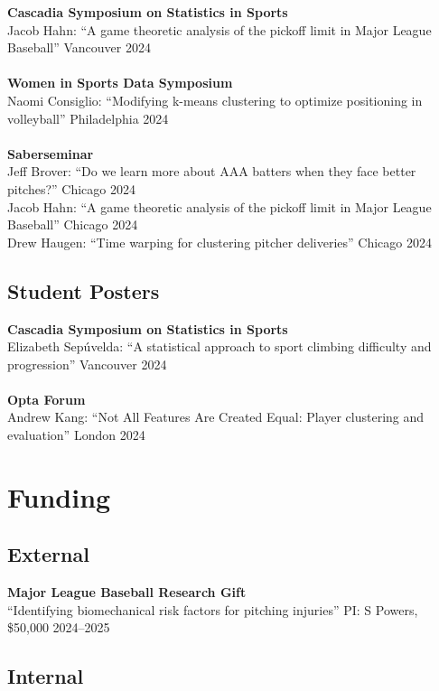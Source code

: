 \documentclass{article}
\begin{document}
{\bf Cascadia Symposium on Statistics in Sports}\\
Jacob Hahn: ``A game theoretic analysis of the pickoff limit in Major League Baseball'' \hfill Vancouver 2024\\
~\\
{\bf Women in Sports Data Symposium}\\
Naomi Consiglio: ``Modifying k-means clustering to optimize positioning in volleyball'' \hfill Philadelphia 2024\\
~\\
{\bf Saberseminar}\\
Jeff Brover: ``Do we learn more about AAA batters when they face better pitches?'' \hfill Chicago 2024\\
Jacob Hahn: ``A game theoretic analysis of the pickoff limit in Major League Baseball'' \hfill Chicago 2024\\
Drew Haugen: ``Time warping for clustering pitcher deliveries'' \hfill Chicago 2024

\subsection*{\sc Student Posters}

{\bf Cascadia Symposium on Statistics in Sports}\\
Elizabeth Sep\'uvelda: ``A statistical approach to sport climbing difficulty and progression'' \hfill Vancouver 2024\\
~\\
{\bf Opta Forum}\\
Andrew Kang: ``Not All Features Are Created Equal: Player clustering and evaluation''  \hfill London 2024


\section*{\sc Funding}

\subsection*{\sc External}

{\bf Major League Baseball Research Gift}\\
``Identifying biomechanical risk factors for pitching injuries'' PI: S Powers, \$50,000 \hfill 2024--2025

\subsection*{\sc Internal}
\end{document}
